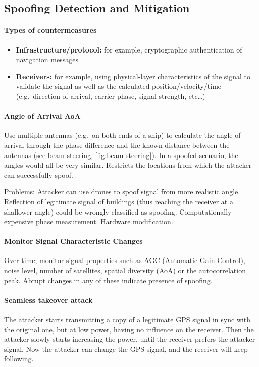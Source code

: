 \subsection{Spoofing Detection and Mitigation}\label{sec:gps-spoof}

\paragraph{Types of countermeasures}
\begin{itemize}
	\item \textbf{Infrastructure/protocol:} for example, cryptographic authentication of navigation messages
	\item \textbf{Receivers:} for example, using physical-layer characteristics of the signal to validate the signal as well as the calculated position/velocity/time (e.g.\ direction of arrival, carrier phase, signal strength, etc\dots)
\end{itemize}

\paragraph{Angle of Arrival AoA}
Use multiple antennas (e.g.\ on both ends of a ship) to calculate the angle of arrival through the phase difference and the known distance between the antennas (see beam steering, \autoref{fig:beam-steering}).
In a spoofed scenario, the angles would all be very similar.
Restricts the locations from which the attacker can successfully spoof.

\underline{Problems:}
Attacker can use drones to spoof signal from more realistic angle.
Reflection of legitimate signal of buildings (thus reaching the receiver at a shallower angle) could be wrongly classified as spoofing.
Computationally expensive phase measurement.
Hardware modification.

\paragraph{Monitor Signal Characteristic Changes}
Over time, monitor signal properties such as AGC (Automatic Gain Control), noise level, number of satellites, spatial diversity (AoA) or the autocorrelation peak.
Abrupt changes in any of these indicate presence of spoofing.

\paragraph{Seamless takeover attack}
The attacker starts transmitting a copy of a legitimate GPS signal in sync with the original one, but at low power, having no influence on the receiver.
Then the attacker slowly starts increasing the power, until the receiver prefers the attacker signal.
Now the attacker can change the GPS signal, and the receiver will keep following. 

